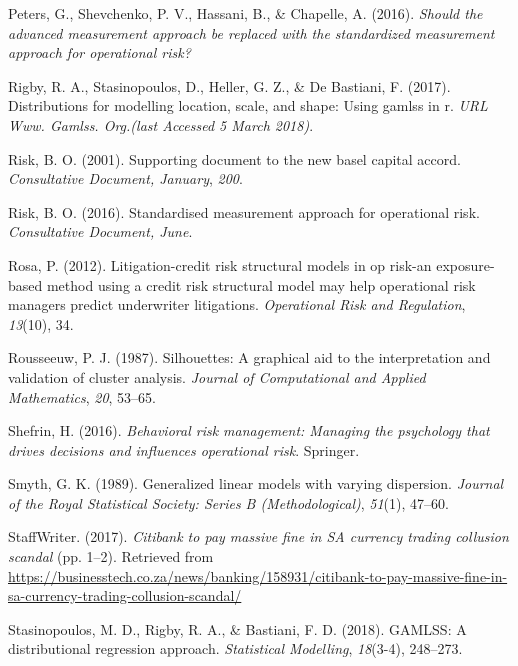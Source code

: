 \documentclass{DissertateUSU}
\begin{document}
\leavevmode\hypertarget{ref-peters2016should}{}%
Peters, G., Shevchenko, P. V., Hassani, B., \& Chapelle, A. (2016).
\emph{Should the advanced measurement approach be replaced with the
standardized measurement approach for operational risk?}

\leavevmode\hypertarget{ref-rigby2017distributions}{}%
Rigby, R. A., Stasinopoulos, D., Heller, G. Z., \& De Bastiani, F.
(2017). Distributions for modelling location, scale, and shape: Using
gamlss in r. \emph{URL Www. Gamlss. Org.(last Accessed 5 March 2018)}.

\leavevmode\hypertarget{ref-risk2001supporting}{}%
Risk, B. O. (2001). Supporting document to the new basel capital accord.
\emph{Consultative Document, January}, \emph{200}.

\leavevmode\hypertarget{ref-risk2016supporting}{}%
Risk, B. O. (2016). Standardised measurement approach for operational
risk. \emph{Consultative Document, June}.

\leavevmode\hypertarget{ref-rosa2012litigation}{}%
Rosa, P. (2012). Litigation-credit risk structural models in op risk-an
exposure-based method using a credit risk structural model may help
operational risk managers predict underwriter litigations.
\emph{Operational Risk and Regulation}, \emph{13}(10), 34.

\leavevmode\hypertarget{ref-rousseeuw1987silhouettes}{}%
Rousseeuw, P. J. (1987). Silhouettes: A graphical aid to the
interpretation and validation of cluster analysis. \emph{Journal of
Computational and Applied Mathematics}, \emph{20}, 53--65.

\leavevmode\hypertarget{ref-shefrin2016behavioral}{}%
Shefrin, H. (2016). \emph{Behavioral risk management: Managing the
psychology that drives decisions and influences operational risk}.
Springer.

\leavevmode\hypertarget{ref-smyth1989generalized}{}%
Smyth, G. K. (1989). Generalized linear models with varying dispersion.
\emph{Journal of the Royal Statistical Society: Series B
(Methodological)}, \emph{51}(1), 47--60.

\leavevmode\hypertarget{ref-bustech2017}{}%
StaffWriter. (2017). \emph{Citibank to pay massive fine in SA currency
trading collusion scandal} (pp. 1--2). Retrieved from
\url{https://businesstech.co.za/news/banking/158931/citibank-to-pay-massive-fine-in-sa-currency-trading-collusion-scandal/}

\leavevmode\hypertarget{ref-stasinopoulos2018gamlss}{}%
Stasinopoulos, M. D., Rigby, R. A., \& Bastiani, F. D. (2018). GAMLSS: A
distributional regression approach. \emph{Statistical Modelling},
\emph{18}(3-4), 248--273.
\end{document}
